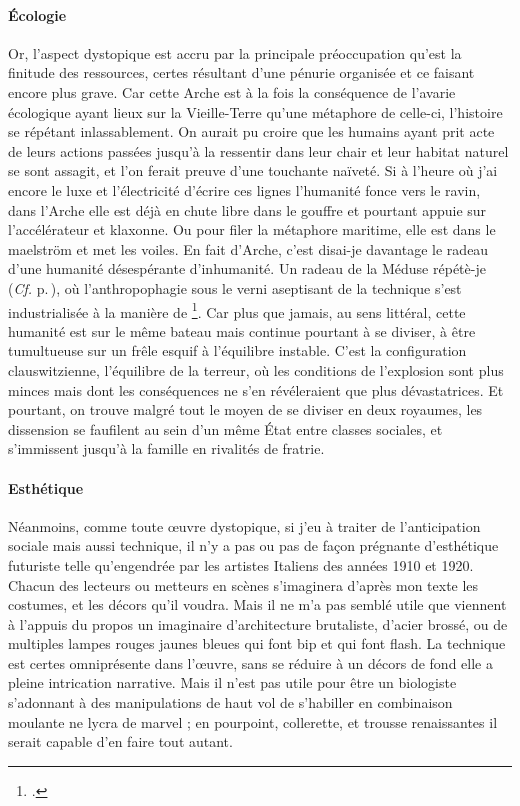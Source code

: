   \paragraph{Écologie}
  Or, l’aspect dystopique est accru par la principale préoccupation qu’est la finitude des ressources, certes résultant d’une pénurie organisée et ce faisant encore plus grave.
  Car cette Arche est à la fois la conséquence de l’avarie écologique ayant lieux sur la Vieille-Terre qu’une métaphore de celle-ci, l’histoire se répétant inlassablement. On aurait pu croire que les humains ayant prit acte de leurs actions passées jusqu’à la ressentir dans leur chair et leur habitat naturel se sont assagit, et l’on ferait preuve d’une touchante naïveté. Si à l’heure où j’ai encore le luxe et l’électricité d’écrire ces lignes l’humanité fonce vers le ravin, dans l’Arche elle est déjà en chute libre dans le gouffre et pourtant appuie sur l’accélérateur et klaxonne. Ou pour filer la métaphore maritime, elle est dans le maelström et met les voiles. En fait d’Arche, c’est disai-je davantage le radeau d’une humanité désespérante d’inhumanité. Un radeau de la Méduse répétè-je (\emph{Cf.} p.\,\pageref{par:radeaumeduse}), où l’anthropophagie sous le verni aseptisant de la technique s’est industrialisée à la manière de \footcite{soleilVert}. Car plus que jamais, au sens littéral, cette humanité est sur le même bateau mais continue pourtant à se diviser, à être tumultueuse sur un frêle esquif à l’équilibre instable. C’est la configuration clauswitzienne, l’équilibre de la terreur, où les conditions de l’explosion sont plus minces mais dont les conséquences ne s’en révéleraient que plus dévastatrices. Et pourtant, on trouve malgré tout le moyen de se diviser en deux royaumes, les dissension se faufilent au sein d’un même État entre classes sociales, et s’immissent jusqu’à la famille en rivalités de fratrie.

  \paragraph{Esthétique}
  Néanmoins, comme toute œuvre dystopique, si j’eu à traiter de l’anticipation sociale mais aussi technique, il n’y a pas ou pas de façon prégnante d’esthétique futuriste telle qu’engendrée par les artistes Italiens des années 1910 et 1920. Chacun des lecteurs ou metteurs en scènes s’imaginera d’après mon texte les costumes, et les décors qu’il voudra. Mais il ne m’a pas semblé utile que viennent à l’appuis du propos un imaginaire d’architecture brutaliste, d’acier brossé, ou de multiples lampes rouges jaunes bleues qui font bip et qui font flash. La technique est certes omniprésente dans l’œuvre, sans se réduire à un décors de fond elle a pleine intrication narrative. Mais il n’est pas utile pour être un biologiste s’adonnant à des manipulations  de haut vol de s’habiller en combinaison moulante ne lycra de marvel ; en pourpoint, collerette, et trousse renaissantes il serait capable d’en faire tout autant.

